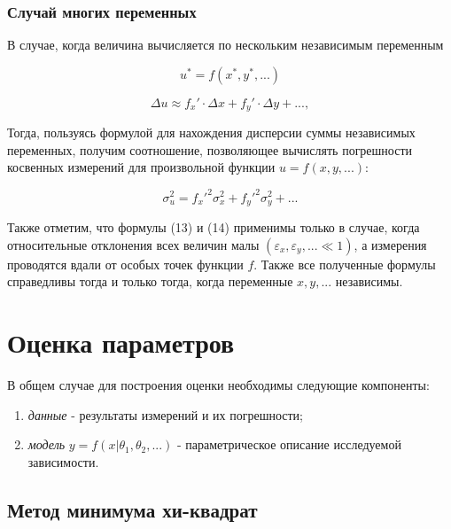 \documentclass[12pt]{article}
\begin{document}
      \subsubsection{Случай многих переменных}

        В случае, когда величина вычисляется по нескольким независимым переменным

        $$
          u^* = f(x^*, y^*, ...)
        $$

        $$
          \Delta u \approx f_x' \cdot \Delta x + f_y' \cdot \Delta y + ...,
        $$

        Тогда, пользуясь формулой для нахождения дисперсии суммы независимых переменных,
        получим соотношение, позволяющее вычислять погрешности косвенных измерений
        для произвольной функции $u = f(x, y, ...)$:

        \begin{equation}
          \sigma_u^2 = f_x'^2 \sigma_x^2 + f_y'^2 \sigma_y^2 + ...
        \end{equation}

        Также отметим, что формулы (13) и (14) применимы только в случае, когда
        относительные отклонения всех величин малы $(\varepsilon_x, \varepsilon_y, ... \ll 1)$,
        а измерения проводятся вдали от особых точек функции $f$. Также все полученные
        формулы справедливы тогда и только тогда, когда переменные $x, y, ...$ независимы.

  \section{Оценка параметров}

    В общем случае для построения оценки необходимы следующие компоненты:

    \begin{enumerate}

      \item \textit{данные} - результаты измерений и их погрешности;

      \item \textit{модель} $y = f(x | \theta_1, \theta_2, ...)$ - параметрическое
      описание исследуемой зависимости.

    \end{enumerate}

    \subsection{Метод минимума хи-квадрат}
\end{document}
